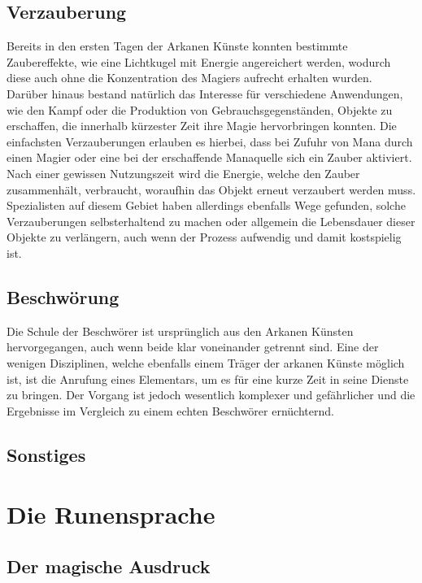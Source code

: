 \documentclass[a4paper,12pt,oneside]{book}
\begin{document}
\chapter{Verzauberung}
Bereits in den ersten Tagen der Arkanen Künste konnten bestimmte Zaubereffekte, wie eine Lichtkugel mit Energie angereichert werden, wodurch diese auch ohne die Konzentration des Magiers aufrecht erhalten wurden. Darüber hinaus bestand natürlich das Interesse für verschiedene Anwendungen, wie den Kampf oder die Produktion von Gebrauchsgegenständen, Objekte zu erschaffen, die innerhalb kürzester Zeit ihre Magie hervorbringen konnten. Die einfachsten Verzauberungen erlauben es hierbei, dass bei Zufuhr von Mana durch einen Magier oder eine bei der erschaffende Manaquelle sich ein Zauber aktiviert. Nach einer gewissen Nutzungszeit wird die Energie, welche den Zauber zusammenhält, verbraucht, woraufhin das Objekt erneut verzaubert werden muss.
\\Spezialisten auf diesem Gebiet haben allerdings ebenfalls Wege gefunden, solche Verzauberungen selbsterhaltend zu machen oder allgemein die Lebensdauer dieser Objekte zu verlängern, auch wenn der Prozess aufwendig und damit kostspielig ist.


\chapter{Beschwörung}
Die Schule der Beschwörer ist ursprünglich aus den Arkanen Künsten hervorgegangen, auch wenn beide klar voneinander getrennt sind. Eine der wenigen Disziplinen, welche ebenfalls einem Träger der arkanen Künste möglich ist, ist die Anrufung eines Elementars, um es für eine kurze Zeit in seine Dienste zu bringen. Der Vorgang ist jedoch wesentlich komplexer und gefährlicher und die Ergebnisse im Vergleich zu einem echten Beschwörer ernüchternd.

\chapter{Sonstiges}


\part{Die Runensprache}

\chapter{Der magische Ausdruck}
\end{document}
